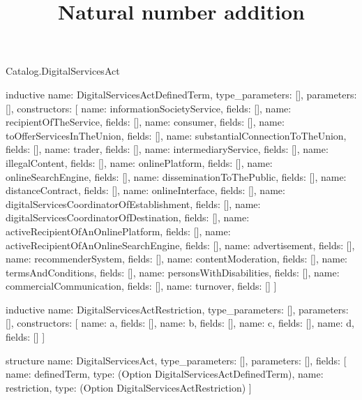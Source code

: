 \begin{lexlean}{Catalog.DigitalServicesAct}
\title{Natural number addition}
\begin{semanticmodule}
inductive{
  name: DigitalServicesActDefinedTerm,
  type_parameters: [],
  parameters: [],
  constructors: [
    {name: informationSocietyService, fields: []},
    {name: recipientOfTheService, fields: []},
    {name: consumer, fields: []},
    {name: toOfferServicesInTheUnion, fields: []},
    {name: substantialConnectionToTheUnion, fields: []},
    {name: trader, fields: []},
    {name: intermediaryService, fields: []},
    {name: illegalContent, fields: []},
    {name: onlinePlatform, fields: []},
    {name: onlineSearchEngine, fields: []},
    {name: disseminationToThePublic, fields: []},
    {name: distanceContract, fields: []},
    {name: onlineInterface, fields: []},
    {name: digitalServicesCoordinatorOfEstablishment, fields: []},
    {name: digitalServicesCoordinatorOfDestination, fields: []},
    {name: activeRecipientOfAnOnlinePlatform, fields: []},
    {name: activeRecipientOfAnOnlineSearchEngine, fields: []},
    {name: advertisement, fields: []},
    {name: recommenderSystem, fields: []},
    {name: contentModeration, fields: []},
    {name: termsAndConditions, fields: []},
    {name: personsWithDisabilities, fields: []},
    {name: commercialCommunication, fields: []},
    {name: turnover, fields: []}
  ]
}

inductive{
  name: DigitalServicesActRestriction,
  type_parameters: [],
  parameters: [],
  constructors: [
    {name: a, fields: []},
    {name: b, fields: []},
    {name: c, fields: []},
    {name: d, fields: []}
  ]
}

structure{
  name: DigitalServicesAct,
  type_parameters: [],
  parameters: [],
  fields: [
    {name: definedTerm, type: (Option DigitalServicesActDefinedTerm)},
    {name: restriction, type: (Option DigitalServicesActRestriction)}
  ]
}
\end{semanticmodule}
\end{lexlean}
